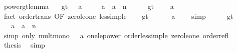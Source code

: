 \begin{isabellebody}
\ power{\isacharunderscore}{\kern0pt}gt{}{\isacharunderscore}{\kern0pt}lemma{\isacharcolon}{\kern0pt}\isanewline
\ \ \ gt{}{\isacharcolon}{\kern0pt}\ {\isachardoublequoteopen}{}\ {\isacharless}{\kern0pt}\ a{\isachardoublequoteclose}\isanewline
\ \ \ {\isachardoublequoteopen}{}\ {\isacharless}{\kern0pt}\ a\ {\isacharasterisk}{\kern0pt}\ a\ {\isacharcircum}{\kern0pt}\ n{\isachardoublequoteclose}\isanewline
%
\isadelimproof
%
\endisadelimproof
%
\isatagproof
{}\isamarkupfalse%
\ {\isacharminus}{\kern0pt}\isanewline
\ \ \isamarkupfalse%
\ gt{}\ \isamarkupfalse%
\ {\isachardoublequoteopen}{}\ {\isasymle}\ a{\isachardoublequoteclose}\isanewline
\ \ \ \ \isamarkupfalse%
\ {\isacharparenleft}{\kern0pt}fact\ order{\isacharunderscore}{\kern0pt}trans\ {\isacharbrackleft}{\kern0pt}OF\ zero{\isacharunderscore}{\kern0pt}le{\isacharunderscore}{\kern0pt}one\ less{\isacharunderscore}{\kern0pt}imp{\isacharunderscore}{\kern0pt}le{\isacharbrackright}{\kern0pt}{\isacharparenright}{\kern0pt}\isanewline
\ \ \isamarkupfalse%
\ gt{}\ \isamarkupfalse%
\ {\isachardoublequoteopen}{}\ {\isacharasterisk}{\kern0pt}\ {}\ {\isacharless}{\kern0pt}\ a\ {\isacharasterisk}{\kern0pt}\ {}{\isachardoublequoteclose}\ \isamarkupfalse%
\ simp\isanewline
\ \ \isamarkupfalse%
\ \isamarkupfalse%
\ gt{}\ \isamarkupfalse%
\ {\isachardoublequoteopen}{\isasymdots}\ {\isasymle}\ a\ {\isacharasterisk}{\kern0pt}\ a\ {\isacharcircum}{\kern0pt}\ n{\isachardoublequoteclose}\isanewline
\ \ \ \ \isamarkupfalse%
\ {\isacharparenleft}{\kern0pt}simp\ only{\isacharcolon}{\kern0pt}\ mult{\isacharunderscore}{\kern0pt}mono\ {\isacartoucheopen}{}\ {\isasymle}\ a{\isacartoucheclose}\ one{\isacharunderscore}{\kern0pt}le{\isacharunderscore}{\kern0pt}power\ order{\isacharunderscore}{\kern0pt}less{\isacharunderscore}{\kern0pt}imp{\isacharunderscore}{\kern0pt}le\ zero{\isacharunderscore}{\kern0pt}le{\isacharunderscore}{\kern0pt}one\ order{\isacharunderscore}{\kern0pt}refl{\isacharparenright}{\kern0pt}\isanewline
\ \ \isamarkupfalse%
\ \isamarkupfalse%
\ {\isacharquery}{\kern0pt}thesis\ \isamarkupfalse%
\ simp\isanewline
{}\isamarkupfalse%
%
\endisatagproof
{\isafoldproof}%
%
\isadelimproof
\isanewline
%
\endisadelimproof

\end{isabellebody}
